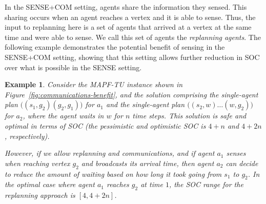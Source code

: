 \documentclass[jair,twoside,11pt,theapa]{article}
\newcommand{\mapftu}{MAPF-TU\xspace}
\newcommand{\sense}{SENSE\xspace}
\newcommand{\sensecom}{SENSE+COM\xspace}
\newtheorem{example}{Example}
\begin{document}
In the \sensecom setting, agents share the information they sensed. 
This sharing occurs when an agent reaches a vertex and it is able to sense. 
Thus, the input to replanning here is a set of agents that arrived at a vertex at the same time and were able to sense. We call this set of agents the \emph{replanning agents}. 
The following example demonstrates the potential benefit of sensing in the \sensecom setting, showing that this setting allows further reduction in SOC over what is possible in the \sense setting.  
\begin{example}
Consider the \mapftu instance shown in Figure~\ref{fig:communications-benefit}, 
and the solution comprising the single-agent plan  
$\big((s_1, g_2)(g_2, g_1)\big)$ for $a_1$ 
and the single-agent plan $\big((s_2, w) \dots (w, g_2)\big)$ 
for $a_2$, where the agent waits in $w$ for $n$ time steps. 
This solution is safe and optimal in terms of SOC (the pessimistic and optimistic SOC is $4+n$ and $4+2n$, respectively). 

However, if we allow replanning and communications, and if agent $a_1$ senses when reaching vertex $g_2$ and broadcasts its arrival time, then agent $a_2$ can decide to reduce the amount of waiting based on how long it took going from $s_1$ to $g_2$.
In the optimal case where agent $a_1$ reaches $g_2$ at time $1$, the SOC range for the replanning approach is $[4, 4+2n]$. %
\end{example}
\end{document}
